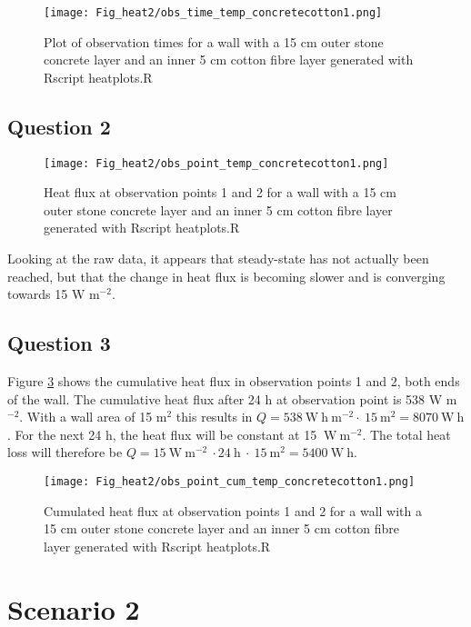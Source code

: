 \begin{figure}[!h]
\centering
\texttt{[image: Fig\_heat2/obs\_time\_temp\_concretecotton1.png]}
\caption{\label{plot1}Plot of observation times for a wall with a 15 cm outer stone concrete layer and an inner 5 cm cotton fibre layer  generated with Rscript heatplots.R}
\end{figure}

\subsection*{Question 2}

\begin{figure}[!h]
\centering
\texttt{[image: Fig\_heat2/obs\_point\_temp\_concretecotton1.png]}
\caption{\label{plot2} Heat flux at observation points 1 and 2 for a wall with a 15 cm outer stone concrete layer and an inner 5 cm cotton fibre layer generated with Rscript heatplots.R}
\end{figure}

Looking at the raw data, it appears that steady-state has not actually been reached, but that the change in heat flux is becoming slower and is converging towards 15 W m$^{-2}$. 

\newpage
\subsection*{Question 3}

Figure \ref{plot3} shows the cumulative heat flux in observation points 1 and 2, both ends of the wall. The cumulative heat flux after 24 h at observation point is 538 W m$^{-2}$. With a wall area of 15 m$^2$ this results in $Q = 538~\mathrm{W~h~m^{-2}}\cdot~15~\mathrm{m^{2}}= 8070 ~\mathrm{W~h}$. 
For the next 24 h, the heat flux will be constant at 15 $\mathrm{~W~m^{-2}}$. The total heat loss will therefore be $Q=15 \mathrm{~W~m^{-2}}~\cdot 24~\mathrm{h}~\cdot~15~\mathrm{m^{2}}=5400 \mathrm{~W~h}$.

\begin{figure}[!h]
\centering
\texttt{[image: Fig\_heat2/obs\_point\_cum\_temp\_concretecotton1.png]}
\caption{\label{plot3} Cumulated heat flux at observation points 1 and 2 for a wall with a 15 cm outer stone concrete layer and an inner 5 cm cotton fibre layer generated with Rscript heatplots.R}
\end{figure}

\newpage

\section*{Scenario 2}


